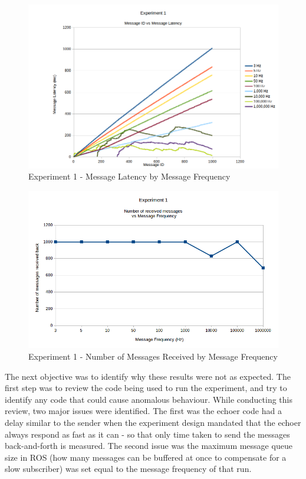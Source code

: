 \documentclass[../dissertation.tex]{subfiles}
\begin{document}
\begin{figure}[H]
\centering
\includegraphics[width=\textwidth]{images/experiment1/msgid_msglatency_all_freqs_version_1.png}
\caption{Experiment 1 - Message Latency by Message Frequency}
\label{exp1-all-freqs}
\end{figure}

\begin{figure}[H]
\centering
\includegraphics[width=\textwidth]{images/experiment1/original-messages-dropped.png}
\caption{Experiment 1 - Number of Messages Received by Message Frequency}
\label{exp1-dropped-messages}
\end{figure}

The next objective was to identify why these results were not as expected. The first step was to review the code being used to run the experiment, and try to identify any code that could cause anomalous behaviour. While conducting this review, two major issues were identified. The first was the echoer code had a delay similar to the sender when the experiment design mandated that the echoer always respond as fast as it can - so that only time taken to send the messages back-and-forth is measured. The second issue was the maximum message queue size in ROS (how many messages can be buffered at once to compensate for a slow subscriber) was set equal to the message frequency of that run.
\end{document}
